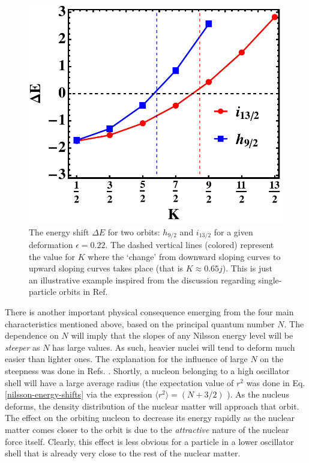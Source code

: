 \begin{figure}
    \centering
    \includegraphics[scale=0.65]{Chapters/Figures/energy_shift_nilssonDeltaE.pdf}
    \caption{The energy shift $\Delta E$ for two orbits: $h_{9/2}$ and $i_{13/2}$ for a given deformation $\epsilon=0.22$. The dashed vertical lines (colored) represent the value for $K$ where the `change' from downward sloping curves to upward sloping curves takes place (that is $K\approx 0.65j$). This is just an illustrative example inspired from the discussion regarding single-particle orbits in Ref. \cite{casten2000nuclear}}
    \label{fig-nilsson-delta-E-shift}
\end{figure}

There is another important physical consequence emerging from the four main characteristics mentioned above, based on the principal quantum number $N$. The dependence on $N$ will imply that the slopes of any Nilsson energy level will be \emph{steeper} as $N$ has large values. As such, heavier nuclei will tend to deform much easier than lighter ones. The explanation for the influence of large $N$ on the steepness was done in Refs. \cite{bohr1998nuclear,krane1991introductory,casten2000nuclear}. Shortly, a nucleon belonging to a high oscillator shell will have a large average radius (the expectation value of $r^2$ was done in Eq. \ref{nilsson-energy-shifts} via the expression $\langle r^2 \rangle=(N+3/2)$ \cite{bertulani2007nuclear}). As the nucleus deforms, the density distribution of the nuclear matter will approach that orbit. The effect on the orbiting nucleon to decrease its energy rapidly as the nuclear matter comes closer to the orbit is due to the \emph{attractive} nature of the nuclear force itself. 
Clearly, this effect is less obvious for a particle in a lower oscillator shell that is already very close to the rest of the nuclear matter.

